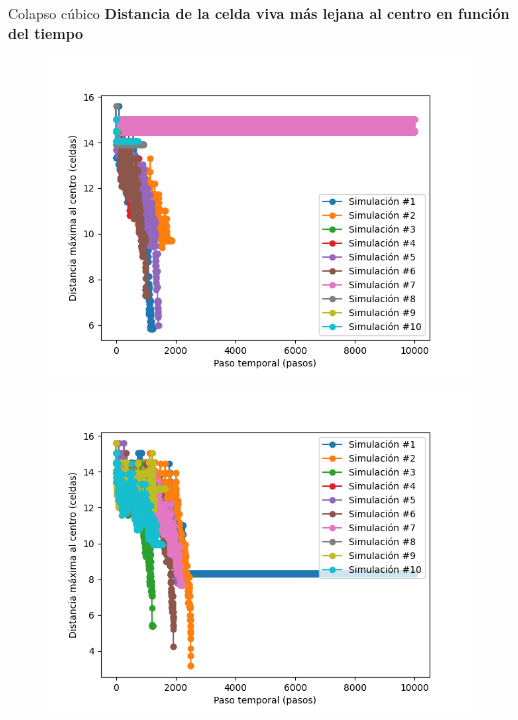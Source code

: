 \begin{frame}{Colapso cúbico}
    \textbf{Distancia de la celda viva más lejana al centro en función del tiempo}
    {\footnotesize
    \begin{multicols}{3}
        {
            \begin{figure}[H]
                \centering
                \includegraphics[width=0.8\linewidth]{pic/collapse3d/distance_i10}
                \label{fig:colapso:distance:i10}
            \end{figure}
        }

        {
            \begin{figure}[H]
                \centering
                \includegraphics[width=0.8\linewidth]{pic/collapse3d/distance_i30}
                \label{fig:colapso:distance:i30}
            \end{figure}
        }


\end{multicols}}
\end{frame}
